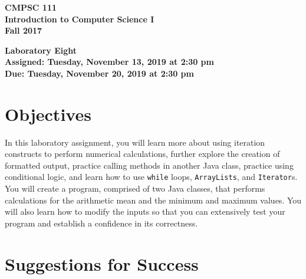 \documentclass[11pt]{article}
\newcommand{\assignmentduedate}{November 20}
\newcommand{\assignmentassignedate}{November 13}
\newcommand{\assignmentnumber}{Eight}
\newcommand{\labyear}{2019}
\newcommand{\labday}{Tuesday}
\newcommand{\labtime}{2:30 pm}
\newcommand{\assigneddate}{Assigned: \labday, \assignmentassignedate, \labyear{} at \labtime{}}
\newcommand{\duedate}{Due: \labday, \assignmentduedate, \labyear{} at \labtime{}}
\newcommand{\labtitle}[1]
{
  \begin{center}
    \begin{center}
      \bf
      CMPSC 111\\Introduction to Computer Science I\\
      Fall 2017\\
      \medskip
    \end{center}
    \bf
    #1
  \end{center}
}
\begin{document}
\thispagestyle{empty}

\labtitle{Laboratory \assignmentnumber{} \\ \assigneddate{} \\ \duedate{}}

\section*{Objectives}

In this laboratory assignment, you will learn more about using iteration
constructs to perform numerical calculations, further explore the creation of
formatted output, practice calling methods in another Java class, practice using
conditional logic, and learn how to use {\tt while} loops, {\tt ArrayLists}, and
{\tt Iterator}s. You will create a program, comprised of two Java classes, that
performs calculations for the arithmetic mean and the minimum and maximum
values. You will also learn how to modify the inputs so that you can extensively
test your program and establish a confidence in its correctness.

\section*{Suggestions for Success}
\end{document}
